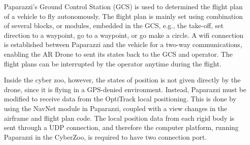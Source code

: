 
Paparazzi's Ground Control Station (GCS) is used to determined the flight plan of a vehicle to fly autonomously. The flight plan is mainly set using combination of several blocks, or modules, embedded in the GCS, e.g., the take-off, set direction to a waypoint, go to a waypoint, or go make a circle. A wifi connection is established between Paparazzi and the vehicle for a two-way communications, enabling the AR Drone to sent its states back to the GCS and operator. The flight plans can be interrupted by the operator anytime during the flight.

Inside the cyber zoo, however, the states of position is not given directly by the drone, since it is flying in a GPS-denied environment. Instead, Paparazzi must be modified to receive data from the OptiTrack local positioning. This is done by using the NavNet module in Paparazzi, coupled with a view changes in the airframe and flight plan code. The local position data from each rigid body is sent through a UDP connection, and therefore the computer platform, running Paparazzi in the CyberZoo, is required to have two connection port. 

